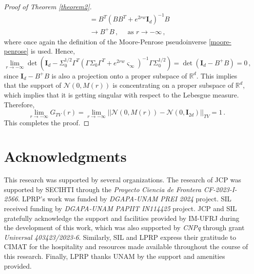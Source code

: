 \documentclass[12pt,thmsa]{article}
\begin{document}
\begin{proof}[Proof of Theorem \ref{theorem2}]
\[\begin{split}
		&=B^T\left(BB^T+e^{2rw}\mathbf{I}_d\right)^{-1}B\\
		&\to  B^+B\,,\quad\mbox{ as }r\to -\infty\,,
	\end{split}
	\]
	where once again the definition of the Moore-Penrose pseudoinverse \eqref{moore-penrose} is used. Hence, 
	$$\lim_{r\to-\infty}\det\left(\mathbf{I}_d-\Sigma_0^{1/2}\Gamma^T\left(\Gamma\Sigma_0\Gamma^T+ e^{2rw}\varsigma_{\infty} \right)^{-1} \Gamma\Sigma_0^{1/2} \right)= \det\left(\mathbf{I}_d-B^+B\right)=0\,,$$
	since $\mathbf{I}_d-B^+B$ is also a projection onto a proper subspace of $\mathbb{R}^d$. This implies that the support of $\mathcal{N}(0, M(r))$ is concentrating on a proper subspace of $\mathbb{R}^d$, which implies that it is getting singular with respect to the Lebesgue measure. Therefore, 
	$$\lim_{r\to-\infty}G_{TV}(r)= \lim_{r\to-\infty}|| \mathcal{N}(0, M(r))-\mathcal{N}(0, \mathbf{I}_{2d})||_{TV}=1\,.$$
	This completes the proof.
\end{proof}


\section*{Acknowledgments}
\noindent
This research was supported by several organizations. The research of JCP was supported by SECIHTI through the {\it Proyecto Ciencia de Frontera CF-2023-I-2566}. LPRP's work was funded by {\it DGAPA-UNAM PREI 2024} project. SIL received funding by {\it DGAPA-UNAM PAPIIT IN114425} project. JCP and SIL gratefully acknowledge the support and facilities provided by IM-UFRJ during the development of this work, which was also supported by {\it CNPq} through grant {\it Universal 403423/2023-6}. Similarly, SIL and LPRP  express their gratitude to CIMAT for the hospitality and resources made available throughout the course of this research. Finally, LPRP thanks UNAM by the support and amenities provided.
\end{document}
